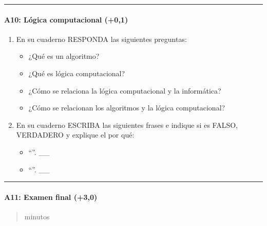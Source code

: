 \documentclass[letterpaper,10pt,spanish]{sphinxmanual}
\begin{document}
\bigskip\hrule\bigskip



\paragraph{A10: Lógica computacional (+0,1)}
\label{\detokenize{cursos/logica8/periodo01/G01:a10-logica-computacional-0-1}}
\sphinxAtStartPar
{}
\begin{enumerate}
%
\item {} 
\sphinxAtStartPar
En su cuaderno RESPONDA las siguientes preguntas:
\begin{itemize}
\item {} 
\sphinxAtStartPar
¿Qué es un algoritmo?

\item {} 
\sphinxAtStartPar
¿Qué es lógica computacional?

\item {} 
\sphinxAtStartPar
¿Cómo se relaciona la lógica computacional y la informática?

\item {} 
\sphinxAtStartPar
¿Cómo se relacionan los algoritmos y la lógica computacional?

\end{itemize}

\item {} 
\sphinxAtStartPar
En su cuaderno ESCRIBA las siguientes frases e indique si es FALSO, VERDADERO y explique el por qué:
\begin{itemize}
\item {} 
\sphinxAtStartPar
“”. \_\_

\item {} 
\sphinxAtStartPar
“”. \_\_

\end{itemize}

\end{enumerate}


\bigskip\hrule\bigskip



\paragraph{A11: Examen final (+3,0)}
\label{\detokenize{cursos/logica8/periodo01/G01:a11-examen-final-3-0}}
\sphinxAtStartPar
{}
\begin{quote}\begin{description}
 minutos


\end{description}\end{quote}
\end{document}
